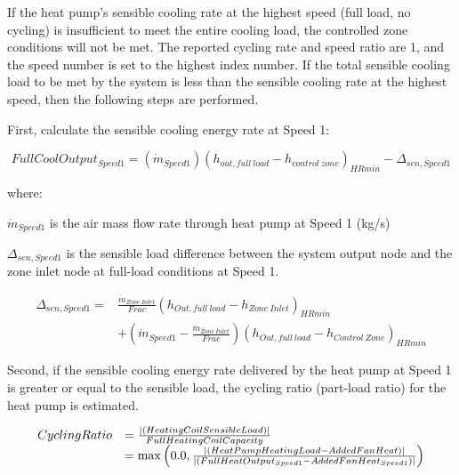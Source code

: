 If the heat pump's sensible cooling rate at the highest speed (full load, no cycling) is insufficient to meet the entire cooling load, the controlled zone conditions will not be met. The reported cycling rate and speed ratio are 1, and the speed number is set to the highest index number. If the total sensible cooling load to be met by the system is less than the sensible cooling rate at the highest speed, then the following steps are performed.

First, calculate the sensible cooling energy rate at Speed 1:

\begin{equation}
FullCoolOutpu{t_{Speed1}} = \left( {{{\dot m}_{Speed1}}} \right){\left( {{h_{out,full~load}} - {h_{control~zone}}} \right)_{HRmin}} - {\Delta_{sen,Speed1}}
\end{equation}

where:

\({{{\dot m}_{Speed1}}}\) is the air mass flow rate through heat pump at Speed 1 (kg/s)

\(\Delta_{sen,Speed1}\) is the sensible load difference between the system output node and the zone inlet node at full-load conditions at Speed 1.

\begin{equation}
\begin{array}{rl}
{\Delta_{sen,Speed1}} =& \frac{{{{\dot m}_{Zone~Inlet}}}}{{Frac}}{\left( {{h_{Out,full~load}} - {h_{Zone~Inlet}}} \right)_{HRmin}} \\
 & + \left( {{{\dot m}_{Speed1}} - \frac{{{{\dot m}_{Zone~Inlet}}}}{{Frac}}} \right){\left( {{h_{Out,full~load}} - {h_{Control~Zone}}} \right)_{HRmin}}
\end{array}
\end{equation}

Second, if the sensible cooling energy rate delivered by the heat pump at Speed 1 is greater or equal to the sensible load, the cycling ratio (part-load ratio) for the heat pump is estimated.

\begin{equation}
  \begin{array}{rl}
    CyclingRatio &= \frac{\left|\left(HeatingCoilSensibleLoad\right)\right|}{FullHeatingCoilCapacity} \\
                 &= \max \left(0.0, \frac{\left|\left(HeatPumpHeatingLoad-AddedFanHeat\right)\right|}{\left|\left(FullHeatOutput_{Speed1}-AddedFanHeat_{Speed1}\right)\right|} \right)
  \end{array}
\label{eq:UnitaryMultiSpeedCyclingRatioCooling}
\end{equation}

